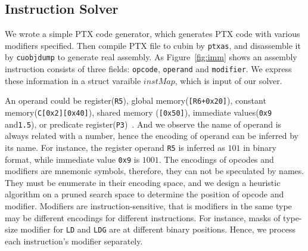 \subsection{Instruction Solver}

We wrote a simple PTX code generator, which generates PTX code with various modifiers specified.
Then compile PTX file to cubin by {\tt ptxas}, and disassemble it by {\tt cuobjdump} to generate real assembly. 
As Figure~\ref{fig:imm} shows an assembly instruction consists of three fields: {\tt opcode}, {\tt operand} and {\tt modifier}. We express these information in a struct
varaible $instMap$, which is input of our solver.

An operand could be register({\tt R5}), 
global memory({\tt [R6+0x20]}), constant memory({\tt C[0x2][0x40]}), shared memory ({\tt [0x50]}),
immediate values({\tt 0x9} and{\tt1.5}), or predicate register({\tt P3})~\cite{ptx2015isa}. %
And we observe the name of operand is always related with a number, hence the encoding of operand can be inferred by its name.
For instance, the register operand {\tt R5} is inferred as $101$ in binary format, while immediate value {\tt 0x9} is $1001$. 
The encodings of opcodes and modifiers are mnemonic symbols, therefore, they can not be speculated by names. 
They must be enumerate in their encoding space, and we design a heuristic algorithm on a pruned search space to
determine the position of opcode and modifier.
Modifiers are instruction-sensitive, that is modifiers in the same type may be different encodings for different instructions. 
For instance, masks of type-size
modifier for {\tt LD} and {\tt LDG} are at different binary positions. Hence, we process each instruction's modifier separately. 

